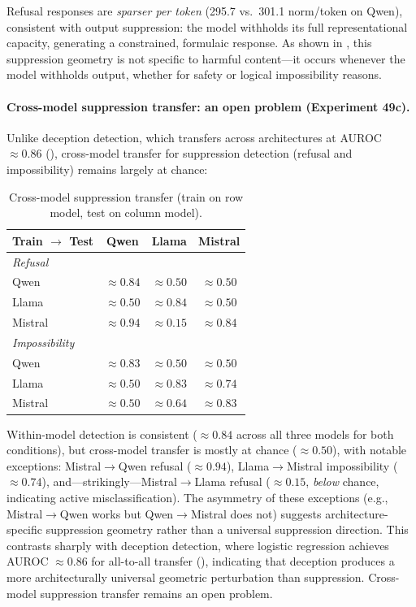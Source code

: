 Refusal responses are \emph{sparser per token} (295.7 vs.\ 301.1 norm/token on Qwen), consistent with output suppression: the model withholds its full representational capacity, generating a constrained, formulaic response. As shown in , this suppression geometry is not specific to harmful content---it occurs whenever the model withholds output, whether for safety or logical impossibility reasons.

\paragraph{Cross-model suppression transfer: an open problem (Experiment 49c).} Unlike deception detection, which transfers across architectures at AUROC $\approx 0.86$ (), cross-model transfer for suppression detection (refusal and impossibility) remains largely at chance:

\begin{table}[H]
\centering
\caption{Cross-model suppression transfer (train on row model, test on column model).}
\label{tab:suppression_transfer}
\begin{tabular}{lccc}
\toprule
\textbf{Train $\to$ Test} & \textbf{Qwen} & \textbf{Llama} & \textbf{Mistral} \\
\midrule
\multicolumn{4}{l}{\emph{Refusal}} \\
Qwen & $\approx 0.84$ & $\approx 0.50$ & $\approx 0.50$ \\
Llama & $\approx 0.50$ & $\approx 0.84$ & $\approx 0.50$ \\
Mistral & $\approx 0.94$ & $\approx 0.15$ & $\approx 0.84$ \\
\midrule
\multicolumn{4}{l}{\emph{Impossibility}} \\
Qwen & $\approx 0.83$ & $\approx 0.50$ & $\approx 0.50$ \\
Llama & $\approx 0.50$ & $\approx 0.83$ & $\approx 0.74$ \\
Mistral & $\approx 0.50$ & $\approx 0.64$ & $\approx 0.83$ \\
\bottomrule
\end{tabular}
\end{table}

Within-model detection is consistent ($\approx 0.84$ across all three models for both conditions), but cross-model transfer is mostly at chance ($\approx 0.50$), with notable exceptions: Mistral$\to$Qwen refusal ($\approx 0.94$), Llama$\to$Mistral impossibility ($\approx 0.74$), and---strikingly---Mistral$\to$Llama refusal ($\approx 0.15$, \emph{below} chance, indicating active misclassification). The asymmetry of these exceptions (e.g., Mistral$\to$Qwen works but Qwen$\to$Mistral does not) suggests architecture-specific suppression geometry rather than a universal suppression direction. This contrasts sharply with deception detection, where logistic regression achieves AUROC $\approx 0.86$ for all-to-all transfer (), indicating that deception produces a more architecturally universal geometric perturbation than suppression. Cross-model suppression transfer remains an open problem.

